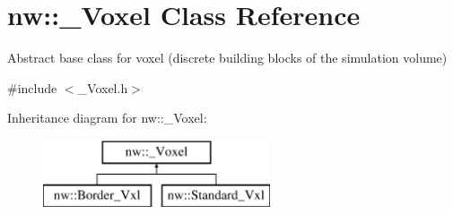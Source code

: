 \hypertarget{classnw_1_1___voxel}{\section{nw\+:\+:\+\_\+\+Voxel Class Reference}
\label{classnw_1_1___voxel}
}


Abstract base class for voxel (discrete building blocks of the simulation volume)  




{\ttfamily \#include $<$\+\_\+\+Voxel.\+h$>$}

Inheritance diagram for nw\+:\+:\+\_\+\+Voxel\+:\begin{figure}[H]
\begin{center}
\leavevmode
\includegraphics[height=2.000000cm]{d3/d7a/classnw_1_1___voxel}
\end{center}
\end{figure}
